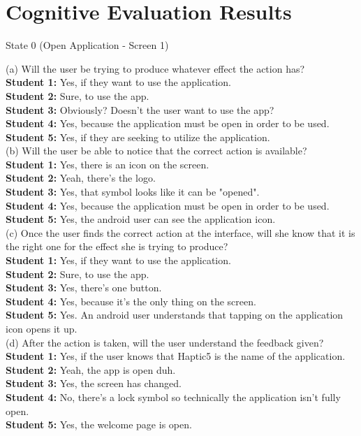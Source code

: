 \documentclass[pdftex,12pt,a4paper]{report}
\begin{document}
\section*{Cognitive Evaluation Results}

\begin{center}
State 0 (Open Application - Screen 1)
\end{center}

(a) Will the user be trying to produce whatever effect the action has?
\\\indent \textbf{Student 1:} Yes, if they want to use the application.
\\\indent \textbf{Student 2:} Sure, to use the app.
\\\indent \textbf{Student 3:} Obviously? Doesn't the user want to use the app?
\\\indent \textbf{Student 4:} Yes, because the application must be open in order to be used.
\\\indent \textbf{Student 5:} Yes, if they are seeking to utilize the application.
\\(b) Will the user be able to notice that the correct action is available?
\\\indent \textbf{Student 1:} Yes, there is an icon on the screen.
\\\indent \textbf{Student 2:} Yeah, there's the logo.
\\\indent \textbf{Student 3:} Yes, that symbol looks like it can be "opened".
\\\indent \textbf{Student 4:} Yes, because the application must be open in order to be used.
\\\indent \textbf{Student 5:} Yes, the android user can see the application icon.
\\(c) Once the user finds the correct action at the interface, will she know that it is the right one for the effect she is trying to produce?
\\\indent \textbf{Student 1:} Yes, if they want to use the application.
\\\indent \textbf{Student 2:} Sure, to use the app.
\\\indent \textbf{Student 3:} Yes, there's one button.
\\\indent \textbf{Student 4:} Yes, because it's the only thing on the screen.
\\\indent \textbf{Student 5:} Yes. An android user understands that tapping on the application icon opens it up.
\\(d) After the action is taken, will the user understand the feedback given?
\\\indent \textbf{Student 1:} Yes, if the user knows that Haptic5 is the name of the application.
\\\indent \textbf{Student 2:} Yeah, the app is open duh.
\\\indent \textbf{Student 3:} Yes, the screen has changed.
\\\indent \textbf{Student 4:} No, there's a lock symbol so technically the application isn't fully open.
\\\indent \textbf{Student 5:} Yes, the welcome page is open.
\end{document}
